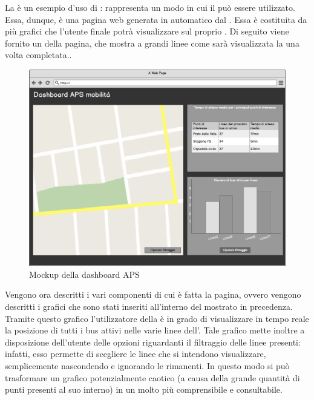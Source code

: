 	La  è un esempio d'uso di : rappresenta un modo in cui il  può essere utilizzato. Essa, dunque, è una pagina web generata in automatico dal  . Essa è costituita da più grafici che l'utente finale potrà visualizzare sul proprio . Di seguito viene fornito un  della pagina, che mostra a grandi linee come sarà visualizzata la  una volta completata..
	\begin{figure}[H]\centering
        \includegraphics[width=\textwidth]{SpecificaTecnica/Pics/DashboardMockup}
        \caption{Mockup della dashboard APS}
    \end{figure}
    Vengono ora descritti i vari componenti di cui è fatta la pagina, ovvero vengono descritti i grafici che sono stati inseriti all'interno del  mostrato in precedenza.
    		Tramite questo grafico l'utilizzatore della  è in grado di visualizzare in tempo reale la posizione di tutti i bus attivi nelle varie linee dell'. Tale grafico mette inoltre a disposizione dell'utente delle opzioni riguardanti il filtraggio delle linee presenti: infatti, esso permette di scegliere le linee che si intendono visualizzare, semplicemente nascondendo e ignorando le rimanenti. In questo modo si può trasformare un grafico potenzialmente caotico (a causa della grande quantità di punti presenti al suo interno) in un molto più comprensibile e consultabile.
